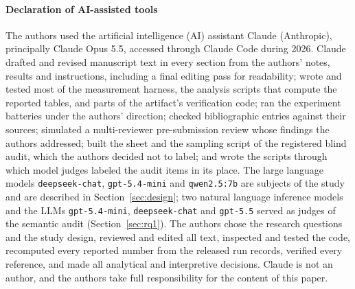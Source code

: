 \paragraph{Declaration of AI-assisted tools}
The authors used the artificial intelligence (AI) assistant Claude (Anthropic), principally Claude Opus 5.5, accessed
through Claude Code during 2026. Claude drafted and revised manuscript text in
every section from the authors' notes, results and instructions, including a
final editing pass for readability; wrote and tested most of the measurement
harness, the analysis scripts that compute the reported tables, and parts of
the artifact's verification code; ran the experiment batteries under the
authors' direction; checked bibliographic entries against their sources;
simulated a multi-reviewer pre-submission review whose findings the authors
addressed; built the sheet and the sampling script of the registered blind audit, which
the authors decided not to label; and wrote the scripts through which model
judges labeled the audit items in its place. The large language models
\texttt{deepseek-chat}, \texttt{gpt-5.4-mini} and \texttt{qwen2.5:7b} are
subjects of the study and are described in Section~\ref{sec:design}; two
natural language inference models and the LLMs \texttt{gpt-5.4-mini},
\texttt{deepseek-chat} and \texttt{gpt-5.5} served as judges of the semantic audit
(Section~\ref{sec:rq1}). The authors chose the research
questions and the study design, reviewed and edited all text, inspected and
tested the code, recomputed every reported number from the released run
records, verified every reference, and made all analytical and interpretive
decisions. Claude is not an author, and the authors take full responsibility
for the content of this paper.
